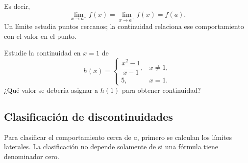 \documentclass[10pt,a5paper]{article}
\newif\ifmostrarSoluciones
\begin{document}
Es decir, 
\[
  \lim_{x\to a^-}f(x)=\lim_{x\to a^+}f(x)=f(a).
\]
Un límite estudia puntos cercanos; la continuidad relaciona ese comportamiento con el valor en el punto.

\begin{ejemplo}
Estudie la continuidad en $x=1$ de
\[
  h(x)=\begin{cases}
    \dfrac{x^2-1}{x-1},&x\neq1,\\[1mm]
    5,&x=1.
  \end{cases}
\]
¿Qué valor se debería asignar a $h(1)$ para obtener continuidad?
\end{ejemplo}
\ifmostrarSoluciones
\begin{solucion}
Para $x\neq1$, $h(x)=x+1$. Por tanto,
\[
  \lim_{x\to1}h(x)=2\neq5=h(1).
\]
El límite existe y $h(1)$ está definido, pero falla la tercera condición. La función es discontinua en $1$. Al reemplazar únicamente $h(1)$ por $2$, se obtiene una función continua en ese punto.
\end{solucion}
\else\vspace{18mm}\fi

\begin{center}
\end{center}

\subsection*{Clasificación de discontinuidades}

Para clasificar el comportamiento cerca de $a$, primero se calculan los límites laterales. La clasificación no depende solamente de si una fórmula tiene denominador cero.
\end{document}
